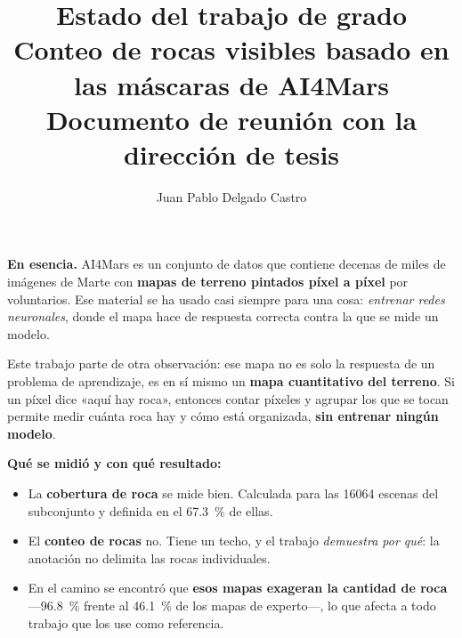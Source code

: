\documentclass[11pt]{article}
\title{\vspace{-1.6cm}\textbf{Estado del trabajo de grado}\\[2mm]
\large Conteo de rocas visibles basado en las máscaras de AI4Mars\\[3mm]
\normalsize Documento de reunión con la dirección de tesis}
\author{Juan Pablo Delgado Castro}
\date{}
\begin{document}
\maketitle
\thispagestyle{empty}

\begin{caja}
\noindent\textbf{En esencia.} AI4Mars es un conjunto de datos que contiene decenas de
miles de imágenes de Marte con \textbf{mapas de terreno pintados píxel a píxel} por
voluntarios. Ese material se ha usado casi siempre para una cosa: \emph{entrenar redes
neuronales}, donde el mapa hace de respuesta correcta contra la que se mide un modelo.

\smallskip
\noindent Este trabajo parte de otra observación: ese mapa no es solo la respuesta de un
problema de aprendizaje, es en sí mismo un \textbf{mapa cuantitativo del terreno}. Si un
píxel dice «aquí hay roca», entonces contar píxeles y agrupar los que se tocan permite
medir cuánta roca hay y cómo está organizada, \textbf{sin entrenar ningún modelo}.

\smallskip
\noindent \textbf{Qué se midió y con qué resultado:}
\begin{itemize}
  \item La \textbf{cobertura de roca} se mide bien. Calculada para las \num{16064} escenas
    del subconjunto y definida en el \SI{67.3}{\percent} de ellas.
  \item El \textbf{conteo de rocas} no. Tiene un techo, y el trabajo \emph{demuestra por
    qué}: la anotación no delimita las rocas individuales.
  \item En el camino se encontró que \textbf{esos mapas exageran la cantidad de roca}
    —\SI{96.8}{\percent} frente al \SI{46.1}{\percent} de los mapas de experto—, lo que
    afecta a todo trabajo que los use como referencia.
\end{itemize}
\end{caja}
\end{document}
